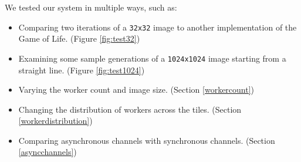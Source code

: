 \documentclass{article}
\begin{document}
    We tested our system in multiple ways, such as:
    
    \begin{itemize}
        \setlength\itemsep{-0.2\baselineskip}
        \item Comparing two iterations of a \verb|32x32| image to another implementation of the Game of Life. (Figure \ref{fig:test32})
        \item Examining some sample generations of a \verb|1024x1024| image starting from a straight line. (Figure \ref{fig:test1024})
        \item Varying the worker count and image size. (Section \ref{workercount})
        \item Changing the distribution of workers across the tiles. (Section \ref{workerdistribution})
        \item Comparing asynchronous channels with synchronous channels. (Section \ref{asyncchannels})
    \end{itemize}
    
\end{document}
